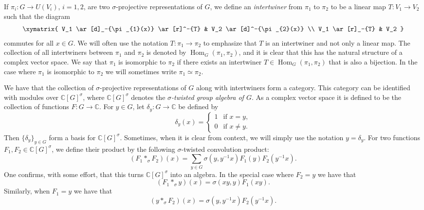 \documentclass[11pt, oneside, reqno]{amsart}
\newcommand{\bbC}{\mathbb{C}}
\newcommand{\Hom}{\operatorname{Hom}}
\theoremstyle{definition}
\theoremstyle{plain}
\theoremstyle{remark}
\begin{document}
If $\pi_i \colon G \to U(V_i)$, $i = 1,2$, are two $\sigma$-projective representations of $G$, we define an \emph{intertwiner} from $\pi_1$ to $\pi_2$ to be a linear map $T \colon V_1 \to V_2$ such that the diagram
\begin{equation*}
    \xymatrix{
        V_1 \ar[d]_-{\pi_{1}(x)} \ar[r]^-{T} & V_2 \ar[d]^-{\pi_{2}(x)} \\
        V_1 \ar[r]_-{T} & V_2
    }
\end{equation*}
commutes for all $x \in G$. We will often use the notation $T \colon \pi_1 \to \pi_2$ to emphasize that $T$ is an intertwiner and not only a linear map. The collection of all intertwiners between $\pi_1$ and $\pi_2$ is denoted by $\Hom_G(\pi_1,\pi_2)$, and it is clear that this has the natural structure of a complex vector space. We say that $\pi_1$ is isomorphic to $\pi_2$ if there exists an intertwiner $T \in \Hom_G(\pi_1,\pi_2)$ that is also a bijection. In the case where $\pi_1$ is isomorphic to $\pi_2$ we will sometimes write $\pi_1 \simeq \pi_2$.

We have that the collection of $\sigma$-projective representations of $G$ along with intertwiners form a category. This category can be identified with modules over $\bbC[G]^\sigma$, where $\bbC[G]^\sigma$ denotes the \emph{$\sigma$-twisted group algebra of $G$}. As a complex vector space it is defined to be the collection of functions $F \colon G \to \bbC$. For $y \in G$, let $\delta_y \colon G \to \bbC$ be defined by
\begin{equation*}
    \delta_y(x) =
    \begin{cases}
        1 & \text{if } x = y, \\
        0 & \text{if } x \neq y.
    \end{cases}
\end{equation*}
Then $\{\delta_y\}_{y \in G}$ form a basis for $\bbC[G]^\sigma$. Sometimes, when it is clear from context, we will simply use the notation $y = \delta_y$. For two functions $F_1,F_2 \in \bbC[G]^\sigma$, we define their product by the following $\sigma$-twisted convolution product:
\begin{equation*}
    (F_1 *_\sigma F_2)(x) = \sum_{y \in G} \sigma(y,y^{-1}x) F_1(y)F_2(y^{-1}x).
\end{equation*}
One confirms, with some effort, that this turns $\bbC[G]^\sigma$ into an algebra. In the special case where $F_2 = y$ we have that
\begin{equation*}
    (F_1 *_\sigma y)(x) = \sigma(xy,y)F_1(xy).
\end{equation*}
Similarly, when $F_1 = y$ we have that
\begin{equation*}
    (y *_\sigma F_2)(x) = \sigma(y,y^{-1}x)F_2(y^{-1}x).
\end{equation*}
\end{document}

